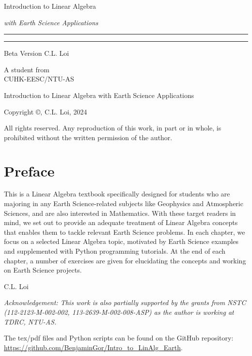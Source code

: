 \begin{titlepage}
    {\Huge\raggedright Introduction to Linear Algebra \par}
    {\Large\raggedright \textit{with Earth Science Applications} \hfill\textcolor{Mahogany}{\rule{3mm}{3mm}} \par}
    \vspace{3mm}\hrule\par
    {\Large\raggedleft Beta Version \hfill C.L. Loi \par}
    \vfill
    {\Large\raggedleft A student from\\
    CUHK-EESC/NTU-AS \par}
\end{titlepage}

\begin{titlepage}
\begin{center}
Introduction to Linear Algebra with Earth Science Applications

Copyright ©, C.L. Loi, 2024

All rights reserved. Any reproduction of this work, in part or in whole, is prohibited without the written permission of the author.
\end{center}
\end{titlepage}


\chapter*{Preface}
This is a Linear Algebra textbook specifically designed for students who are majoring in any Earth Science-related subjects like Geophysics and Atmospheric Sciences, and are also interested in Mathematics. With these target readers in mind, we set out to provide an adequate treatment of Linear Algebra concepts that enables them to tackle relevant Earth Science problems. In each chapter, we focus on a selected Linear Algebra topic, motivated by Earth Science examples and supplemented with Python programming tutorials. At the end of each chapter, a number of exercises are given for elucidating the concepts and working on Earth Science projects. \par
{\raggedleft C.L. Loi \par}
\textit{Acknowledgement: This work is also partially supported by the grants from NSTC (112-2123-M-002-002, 113-2639-M-002-008-ASP) as the author is working at TDRC, NTU-AS.}\par
The tex/pdf files and Python scripts can be found on the GitHub repository:\\ \href{https://github.com/BenjaminGor/Intro_to_LinAlg_Earth}{https://github.com/BenjaminGor/Intro\_to\_LinAlg\_Earth}.

